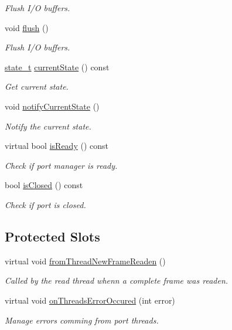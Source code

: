 \begin{DoxyCompactItemize}
\begin{DoxyCompactList}\small\item\em Flush I/O buffers. \end{DoxyCompactList}\item 
void \hyperlink{classmdt_port_manager_a3eab774008d7530ae341ce9c38265d65}{flush} ()
\begin{DoxyCompactList}\small\item\em Flush I/O buffers. \end{DoxyCompactList}\item 
\hypertarget{classmdt_port_manager_a59241d9e6b6ee71e6c1aeb3e6c0ca81a}{
\hyperlink{classmdt_port_manager_a9448339d7f08ca5e18b904df25b382da}{state\_\-t} \hyperlink{classmdt_port_manager_a59241d9e6b6ee71e6c1aeb3e6c0ca81a}{currentState} () const }
\label{classmdt_port_manager_a59241d9e6b6ee71e6c1aeb3e6c0ca81a}

\begin{DoxyCompactList}\small\item\em Get current state. \end{DoxyCompactList}\item 
void \hyperlink{classmdt_port_manager_a0c460b47b12e38e708321be79f6343d8}{notifyCurrentState} ()
\begin{DoxyCompactList}\small\item\em Notify the current state. \end{DoxyCompactList}\item 
virtual bool \hyperlink{classmdt_port_manager_a6dc2798324521d177fb8f79d4f6c5f0f}{isReady} () const 
\begin{DoxyCompactList}\small\item\em Check if port manager is ready. \end{DoxyCompactList}\item 
bool \hyperlink{classmdt_port_manager_aeecbec49376838ab3547729636166d97}{isClosed} () const 
\begin{DoxyCompactList}\small\item\em Check if port is closed. \end{DoxyCompactList}\end{DoxyCompactItemize}
\subsection*{Protected Slots}
\begin{DoxyCompactItemize}
\item 
virtual void \hyperlink{classmdt_port_manager_a4fcc8f0699b655156e661bb3de6056cc}{fromThreadNewFrameReaden} ()
\begin{DoxyCompactList}\small\item\em Called by the read thread whenn a complete frame was readen. \end{DoxyCompactList}\item 
virtual void \hyperlink{classmdt_port_manager_a7e45b8e3475e5182ed12218616664d07}{onThreadsErrorOccured} (int error)
\begin{DoxyCompactList}\small\item\em Manage errors comming from port threads. \end{DoxyCompactList}\end{DoxyCompactItemize}
